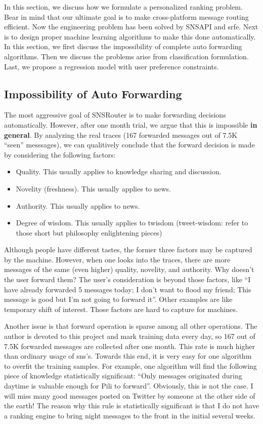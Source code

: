 \documentclass{sig-alternate}
\begin{document}
In this section, we discuss how we formulate a personalized ranking problem. 
Bear in mind that our ultimate goal is to make 
cross-platform message routing efficient. 
Now the engineering problem has been solved by SNSAPI and \gls{srfe}. 
Next is to design proper machine learning algorithms to make this done automatically. 
In this section, we first discuss the impossibility of 
complete auto forwarding algorithms. 
Then we discuss the problems arise from classification formulation. 
Last, we propose a regression model with user preference constraints. 

\subsection{Impossibility of Auto Forwarding}
\label{sec:Impossibility of Auto Forwarding}

The most aggressive goal of SNSRouter is to make forwarding decisions automatically. 
However, after one month trial, we argue that this is impossible \textbf{in general}. 
By analyzing the real traces (167 forwarded messages out of 7.5K ``seen'' messsages), 
we can qualitively conclude that the forward decision is made by 
considering the following factors:
\begin{itemize}
	\item Quality. 
		This usually applies to knowledge sharing and discussion. 
	\item Novelity (freshness). 
		This usually applies to news. 
	\item Authority. 
		This usually applies to news. 
	\item Degree of wisdom. 
		This usually applies to twisdom 
		(tweet-wisdom: refer to those short but philosophy enlightening pieces)
\end{itemize}

Although people have different tastes, the former three factors
may be captured by the machine. 
However, when one looks into the traces, there are more messages 
of the same (even higher) quality, novelity, and authority. 
Why doesn't the user forward them? 
The user's consideration is beyond those factors, like
``I have already forwarded 5 messages today; 
I don't want to flood my friend;
This message is good but I'm not going to forward it''. 
Other examples are like temporary shift of interest. 
Those factors are hard to capture for machines.

Another issue is that forward operation is sparse among all other operations. 
The author is devoted to this project and mark training data every day, 
so 167 out of 7.5K forwarded messages are collected after one month. 
This rate is much higher than ordinary usage of \gls{sns}'s. 
Towards this end, it is very easy for one algorithm to overfit the training samples. 
For example, one algorithm will find the following piece of knowledge 
statistically significant:
``Only messages originated during daytime is valuable enough for Pili to forward''.
Obviously, this is not the case. 
I will miss many good messages posted on Twitter by someone 
at the other side of the earth!
The reason why this rule is statistically significant is that 
I do not have a ranking engine to bring night messages to the front 
in the initial several weeks. 
\end{document}
